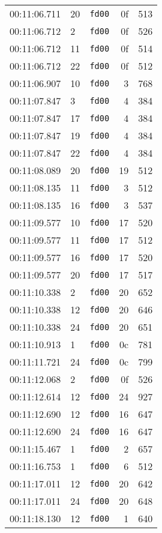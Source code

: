\documentclass{article}
\begin{document}
\begin{longtable}{lllrr}
00:11:06.711 & 20 & \texttt{fd00} & 0f & 513 \\
00:11:06.712 & 2 & \texttt{fd00} & 0f & 526 \\
00:11:06.712 & 11 & \texttt{fd00} & 0f & 514 \\
00:11:06.712 & 22 & \texttt{fd00} & 0f & 512 \\
00:11:06.907 & 10 & \texttt{fd00} & 3 & 768 \\
00:11:07.847 & 3 & \texttt{fd00} & 4 & 384 \\
00:11:07.847 & 17 & \texttt{fd00} & 4 & 384 \\
00:11:07.847 & 19 & \texttt{fd00} & 4 & 384 \\
00:11:07.847 & 22 & \texttt{fd00} & 4 & 384 \\
00:11:08.089 & 20 & \texttt{fd00} & 19 & 512 \\
00:11:08.135 & 11 & \texttt{fd00} & 3 & 512 \\
00:11:08.135 & 16 & \texttt{fd00} & 3 & 537 \\
00:11:09.577 & 10 & \texttt{fd00} & 17 & 520 \\
00:11:09.577 & 11 & \texttt{fd00} & 17 & 512 \\
00:11:09.577 & 16 & \texttt{fd00} & 17 & 520 \\
00:11:09.577 & 20 & \texttt{fd00} & 17 & 517 \\
00:11:10.338 & 2 & \texttt{fd00} & 20 & 652 \\
00:11:10.338 & 12 & \texttt{fd00} & 20 & 646 \\
00:11:10.338 & 24 & \texttt{fd00} & 20 & 651 \\
00:11:10.913 & 1 & \texttt{fd00} & 0c & 781 \\
00:11:11.721 & 24 & \texttt{fd00} & 0c & 799 \\
00:11:12.068 & 2 & \texttt{fd00} & 0f & 526 \\
00:11:12.614 & 12 & \texttt{fd00} & 24 & 927 \\
00:11:12.690 & 12 & \texttt{fd00} & 16 & 647 \\
00:11:12.690 & 24 & \texttt{fd00} & 16 & 647 \\
00:11:15.467 & 1 & \texttt{fd00} & 2 & 657 \\
00:11:16.753 & 1 & \texttt{fd00} & 6 & 512 \\
00:11:17.011 & 12 & \texttt{fd00} & 20 & 642 \\
00:11:17.011 & 24 & \texttt{fd00} & 20 & 648 \\
00:11:18.130 & 12 & \texttt{fd00} & 1 & 640 \\

\end{longtable}
\end{document}
